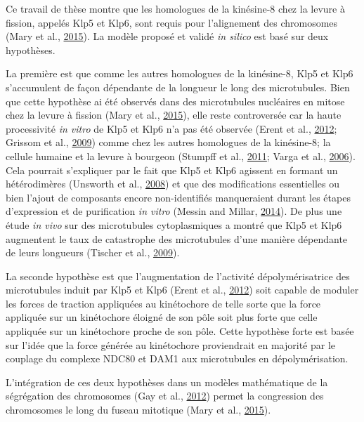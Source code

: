 \documentclass[12pt,a4paper,twoside,openright]{book}
\begin{document}
Ce travail de thèse montre que les homologues de la kinésine-8 chez la
levure à fission, appelés Klp5 et Klp6, sont requis pour l'alignement
des chromosomes (Mary et al., \protect\hyperlink{ref-Mary2015}{2015}).
La modèle proposé et validé \emph{in silico} est basé sur deux
hypothèses.

La première est que comme les autres homologues de la kinésine-8, Klp5
et Klp6 s'accumulent de façon dépendante de la longueur le long des
microtubules. Bien que cette hypothèse ai été observés dans des
microtubules nucléaires en mitose chez la levure à fission (Mary et al.,
\protect\hyperlink{ref-Mary2015}{2015}), elle reste controversée car la
haute processivité \emph{in vitro} de Klp5 et Klp6 n'a pas été observée
(Erent et al., \protect\hyperlink{ref-Erent2012}{2012}; Grissom et al.,
\protect\hyperlink{ref-Grissom2009}{2009}) comme chez les autres
homologues de la kinésine-8; la cellule humaine et la levure à bourgeon
(Stumpff et al., \protect\hyperlink{ref-Stumpff2011a}{2011}; Varga et
al., \protect\hyperlink{ref-Varga2006}{2006}). Cela pourrait s'expliquer
par le fait que Klp5 et Klp6 agissent en formant un hétérodimères
(Unsworth et al., \protect\hyperlink{ref-Unsworth2008}{2008}) et que des
modifications essentielles ou bien l'ajout de composants encore
non-identifiés manqueraient durant les étapes d'expression et de
purification \emph{in vitro} (Messin and Millar,
\protect\hyperlink{ref-Messin2014}{2014}). De plus une étude \emph{in
vivo} sur des microtubules cytoplasmiques a montré que Klp5 et Klp6
augmentent le taux de catastrophe des microtubules d'une manière
dépendante de leurs longueurs (Tischer et al.,
\protect\hyperlink{ref-Tischer2009}{2009}).

La seconde hypothèse est que l'augmentation de l'activité
dépolymérisatrice des microtubules induit par Klp5 et Klp6 (Erent et
al., \protect\hyperlink{ref-Erent2012}{2012}) soit capable de moduler
les forces de traction appliquées au kinétochore de telle sorte que la
force appliquée sur un kinétochore éloigné de son pôle soit plus forte
que celle appliquée sur un kinétochore proche de son pôle. Cette
hypothèse forte est basée sur l'idée que la force générée au kinétochore
proviendrait en majorité par le couplage du complexe NDC80 et DAM1 aux
microtubules en dépolymérisation.

L'intégration de ces deux hypothèses dans un modèles mathématique de la
ségrégation des chromosomes (Gay et al.,
\protect\hyperlink{ref-Gay2012a}{2012}) permet la congression des
chromosomes le long du fuseau mitotique (Mary et al.,
\protect\hyperlink{ref-Mary2015}{2015}).
\end{document}
